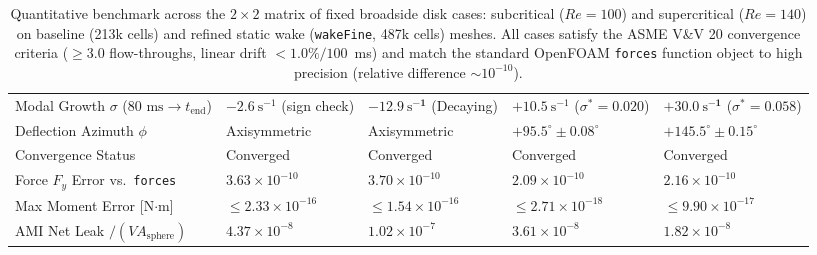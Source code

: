 \documentclass[11pt,a4paper]{article}
\begin{document}
\begin{table}[htbp]
\begin{tabularx}{\textwidth}{>{\raggedright\arraybackslash}p{44mm} >{\centering\arraybackslash}X >{\centering\arraybackslash}X >{\centering\arraybackslash}X >{\centering\arraybackslash}X}
Modal Growth $\sigma$ ($80\text{ ms} \to t_{\mathrm{end}}$) & $-2.6\ \mathrm{s}^{-1}$ (sign check) & $\mathbf{-12.9\ \mathrm{s}^{-1}}$ (Decaying) & $+10.5\ \mathrm{s}^{-1}$ ($\sigma^* = 0.020$) & $\mathbf{+30.0\ \mathrm{s}^{-1}}$ ($\sigma^* = 0.058$) \\
Deflection Azimuth $\phi$ & Axisymmetric & Axisymmetric & $+95.5^\circ \pm 0.08^\circ$ & $+145.5^\circ \pm 0.15^\circ$ \\
Convergence Status & Converged & Converged & Converged & Converged \\
\midrule
Force $F_y$ Error vs.\ \texttt{forces} & $3.63 \times 10^{-10}$ & $3.70 \times 10^{-10}$ & $2.09 \times 10^{-10}$ & $2.16 \times 10^{-10}$ \\
Max Moment Error [N$\cdot$m] & $\le 2.33 \times 10^{-16}$ & $\le 1.54 \times 10^{-16}$ & $\le 2.71 \times 10^{-18}$ & $\le 9.90 \times 10^{-17}$ \\
AMI Net Leak $/ (V A_{\mathrm{sphere}})$ & $4.37 \times 10^{-8}$ & $1.02 \times 10^{-7}$ & $3.61 \times 10^{-8}$ & $1.82 \times 10^{-8}$ \\
\bottomrule
\end{tabularx}
\caption{Quantitative benchmark across the $2 \times 2$ matrix of fixed broadside disk cases: subcritical ($Re = 100$) and supercritical ($Re = 140$) on baseline (213k cells) and refined static wake (\texttt{wakeFine}, 487k cells) meshes. All cases satisfy the ASME V\&V 20 convergence criteria ($\ge 3.0$ flow-throughs, linear drift $< 1.0\% / 100$~ms) and match the standard OpenFOAM \texttt{forces} function object to high precision (relative difference $\sim 10^{-10}$).}
\label{tab:fixed_disk_comparison}
\end{table}
\end{document}
